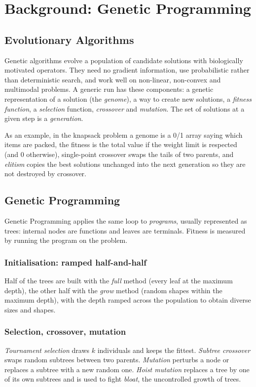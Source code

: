 \chapter{Background: Genetic Programming}
\label{ch:background}

\section{Evolutionary Algorithms}
Genetic algorithms evolve a population of candidate solutions with biologically
motivated operators. They need no gradient information, use probabilistic
rather than deterministic search, and work well on non-linear, non-convex and
multimodal problems. A generic run has these components: a genetic
representation of a solution (the \emph{genome}), a way to create new solutions,
a \emph{fitness function}, a \emph{selection} function, \emph{crossover} and
\emph{mutation}. The set of solutions at a given step is a \emph{generation}.

As an example, in the knapsack problem a genome is a 0/1 array saying which items
are packed, the fitness is the total value if the weight limit is respected
(and 0 otherwise), single-point crossover swaps the tails of two parents, and
\emph{elitism} copies the best solutions unchanged into the next generation so
they are not destroyed by crossover.

\section{Genetic Programming}
Genetic Programming \citep{koza1994gp} applies the same loop to \emph{programs},
usually represented as trees: internal nodes are functions and leaves are
terminals. Fitness is measured by running the program on the problem.

\subsection{Initialisation: ramped half-and-half}
Half of the trees are built with the \emph{full} method (every leaf at the
maximum depth), the other half with the \emph{grow} method (random shapes within
the maximum depth), with the depth ramped across the population to obtain
diverse sizes and shapes.

\subsection{Selection, crossover, mutation}
\emph{Tournament selection} draws $k$ individuals and keeps the fittest.
\emph{Subtree crossover} swaps random subtrees between two parents.
\emph{Mutation} perturbs a node or replaces a subtree with a new random one.
\emph{Hoist mutation} replaces a tree by one of its own subtrees and is used to
fight \emph{bloat}, the uncontrolled growth of trees.

